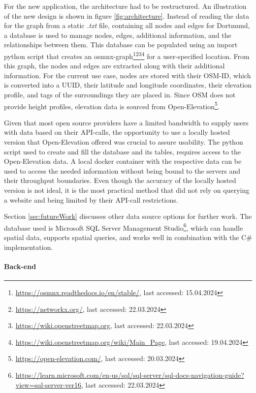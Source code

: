 For the new application, the architecture had to be restructured.
An illustration of the new design is shown in figure \ref{fig:architecture}.
Instead of reading the data for the graph from a static \textit{.txt} file, containing all nodes and edges for Dortmund, a database is used to manage nodes, edges, additional information, and the relationships between them. 
This database can be populated using an import python script that creates an osmnx-graph\footnote{\url{https://osmnx.readthedocs.io/en/stable/}, last accessed: 15.04.2024}\footnote{\url{https://networkx.org/}, last accessed: 22.03.2024}\footnote{\url{https://wiki.openstreetmap.org}, last accessed: 22.03.2024}\footnote{\url{https://wiki.openstreetmap.org/wiki/Main_Page}, last accessed: 19.04.2024} for a user-specified location. 
From this graph, the nodes and edges are extracted along with their additional information.
For the current use case, nodes are stored with their OSM-ID, which is converted into a UUID, their latitude and longitude coordinates, their elevation profile, and tags of the surroundings they are placed in.
Since OSM does not provide height profiles, elevation data is sourced from  Open-Elevation\footnote{\url{https://open-elevation.com/}, last accessed: 20.03.2024}. 

Given that most open source providers have a limited bandwidth to supply users with data based on their API-calls, the opportunity to use a locally hosted version that Open-Elevation offered was crucial to assure usability.
The python script used to create and fill the database and its tables, requires access to the Open-Elevation data.
A local docker container with the respective data can be used to access the needed information without being bound to the servers and their throughput boundaries. 
Even though the accuracy of the locally hosted version is not ideal, it is the most practical method that did not rely on querying a website and being limited by their API-call restrictions.


Section \ref{sec:futureWork} discusses other data source options for further work.
The database used is Microsoft SQL Server Management Studio\footnote{\url{https://learn.microsoft.com/en-us/sql/sql-server/sql-docs-navigation-guide?view=sql-server-ver16}, last accessed: 22.03.2024}, which can handle spatial data, supports spatial queries, and works well in combination with the C\# implementation.

\paragraph{Back-end}

